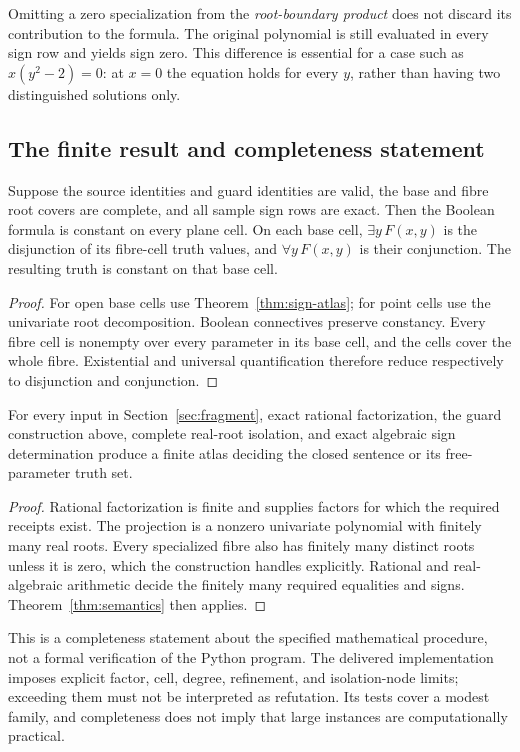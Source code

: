 Omitting a zero specialization from the \emph{root-boundary product} does not discard its contribution to the formula. The original polynomial is still evaluated in every sign row and yields sign zero. This difference is essential for a case such as $x(y^2-2)=0$: at $x=0$ the equation holds for every $y$, rather than having two distinguished solutions only.

\subsection{The finite result and completeness statement}
\begin{theorem}\label{thm:semantics}
Suppose the source identities and guard identities are valid, the base and fibre root covers are complete, and all sample sign rows are exact. Then the Boolean formula is constant on every plane cell. On each base cell, $\exists y\,F(x,y)$ is the disjunction of its fibre-cell truth values, and $\forall y\,F(x,y)$ is their conjunction. The resulting truth is constant on that base cell.
\end{theorem}
\begin{proof}
For open base cells use Theorem~\ref{thm:sign-atlas}; for point cells use the univariate root decomposition. Boolean connectives preserve constancy. Every fibre cell is nonempty over every parameter in its base cell, and the cells cover the whole fibre. Existential and universal quantification therefore reduce respectively to disjunction and conjunction.
\end{proof}

\begin{corollary}
For every input in Section~\ref{sec:fragment}, exact rational factorization, the guard construction above, complete real-root isolation, and exact algebraic sign determination produce a finite atlas deciding the closed sentence or its free-parameter truth set.
\end{corollary}
\begin{proof}
Rational factorization is finite and supplies factors for which the required receipts exist. The projection is a nonzero univariate polynomial with finitely many real roots. Every specialized fibre also has finitely many distinct roots unless it is zero, which the construction handles explicitly. Rational and real-algebraic arithmetic decide the finitely many required equalities and signs. Theorem~\ref{thm:semantics} then applies.
\end{proof}

This is a completeness statement about the specified mathematical procedure, not a formal verification of the Python program. The delivered implementation imposes explicit factor, cell, degree, refinement, and isolation-node limits; exceeding them must not be interpreted as refutation. Its tests cover a modest family, and completeness does not imply that large instances are computationally practical.
